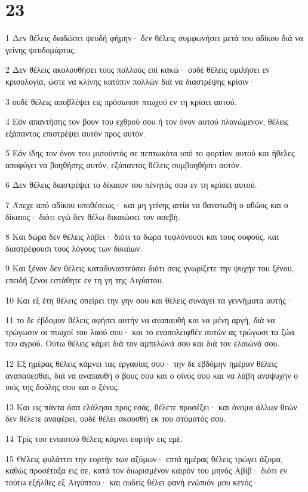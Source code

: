 \chapter{23}

\par 1 Δεν θέλεις διαδώσει ψευδή φήμην· δεν θέλεις συμφωνήσει μετά του αδίκου διά να γείνης ψευδομάρτυς.
\par 2 Δεν θέλεις ακολουθήσει τους πολλούς επί κακώ· ουδέ θέλεις ομιλήσει εν κρισολογία, ώστε να κλίνης κατόπιν πολλών διά να διαστρέψης κρίσιν·
\par 3 ουδέ θέλεις αποβλέψει εις πρόσωπον πτωχού εν τη κρίσει αυτού.
\par 4 Εάν απαντήσης τον βουν του εχθρού σου ή τον όνον αυτού πλανώμενον, θέλεις εξάπαντος επιστρέψει αυτόν προς αυτόν.
\par 5 Εάν ίδης τον όνον του μισούντός σε πεπτωκότα υπό το φορτίον αυτού και ήθελες αποφύγει να βοηθήσης αυτόν, εξάπαντος θέλεις συμβοηθήσει αυτόν.
\par 6 Δεν θέλεις διαστρέψει το δίκαιον του πένητός σου εν τη κρίσει αυτού.
\par 7 Άπεχε από αδίκου υποθέσεως· και μη γείνης αιτία να θανατωθή ο αθώος και ο δίκαιος· διότι εγώ δεν θέλω δικαιώσει τον ασεβή.
\par 8 Και δώρα δεν θέλεις λάβει· διότι τα δώρα τυφλόνουσι και τους σοφούς, και διαστρέφουσι τους λόγους των δικαίων.
\par 9 Και ξένον δεν θέλεις καταδυναστεύσει διότι σεις γνωρίζετε την ψυχήν του ξένου, επειδή ξένοι εστάθητε εν τη γη της Αιγύπτου.
\par 10 Και εξ έτη θέλεις σπείρει την γην σου και θέλεις συνάγει τα γεννήματα αυτής·
\par 11 το δε έβδομον θέλεις αφήσει αυτήν να αναπαυθή και να μένη αργή, διά να τρώγωσιν οι πτωχοί του λαού σου· και το εναπολειφθέν αυτών ας τρώγωσι τα ζώα του αγρού. Ούτω θέλεις κάμει διά τον αμπελώνά σου και διά τον ελαιώνά σου.
\par 12 Εξ ημέρας θέλεις κάμνει τας εργασίας σου· την δε εβδόμην ημέραν θέλεις αναπαύεσθαι, διά να αναπαυθή ο βους σου και ο οίνος σου και να λάβη αναψυχήν ο υιός της δούλης σου και ο ξένος.
\par 13 Και εις πάντα όσα ελάλησα προς εσάς, θέλετε προσέξει· και όνομα άλλων θεών δεν θέλετε αναφέρει, ουδέ θέλει ακουσθή εκ του στόματός σου.
\par 14 Τρίς του ενιαυτού θέλεις κάμνει εορτήν εις εμέ.
\par 15 Θέλεις φυλάττει την εορτήν των αζύμων· επτά ημέρας θέλεις τρώγει άζυμα, καθώς προσέταξα εις σε, κατά τον διωρισμένον καιρόν του μηνός Αβίβ· διότι εν τούτω εξήλθες εξ Αιγύπτου· και ουδείς θέλει φανή ενώπιόν μου κενός·
